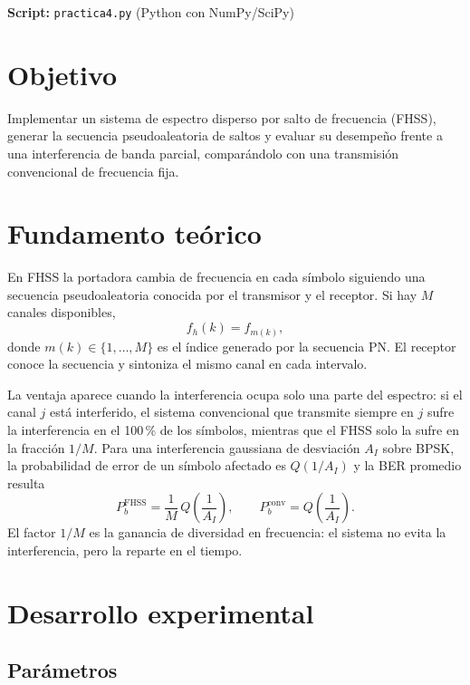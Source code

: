 \documentclass[11pt,a4paper]{article}
\begin{document}

\textbf{Script:} \texttt{practica4.py} (Python con NumPy/SciPy)

\section{Objetivo}

Implementar un sistema de espectro disperso por salto de frecuencia (FHSS), generar la
secuencia pseudoaleatoria de saltos y evaluar su desempeño frente a una interferencia de
banda parcial, comparándolo con una transmisión convencional de frecuencia fija.

\section{Fundamento teórico}

En FHSS la portadora cambia de frecuencia en cada símbolo siguiendo una secuencia
pseudoaleatoria conocida por el transmisor y el receptor. Si hay $M$ canales disponibles,
\begin{equation}
  f_h(k) = f_{m(k)},
\end{equation}
donde $m(k)\in\{1,\dots,M\}$ es el índice generado por la secuencia PN. El receptor conoce
la secuencia y sintoniza el mismo canal en cada intervalo.

La ventaja aparece cuando la interferencia ocupa solo una parte del espectro: si el canal
$j$ está interferido, el sistema convencional que transmite siempre en $j$ sufre la
interferencia en el 100\,\% de los símbolos, mientras que el FHSS solo la sufre en la
fracción $1/M$. Para una interferencia gaussiana de desviación $A_I$ sobre BPSK, la
probabilidad de error de un símbolo afectado es $Q(1/A_I)$ y la BER promedio resulta
\begin{equation}
  P_b^{\mathrm{FHSS}} = \frac{1}{M}\,Q\!\left(\frac{1}{A_I}\right),
  \qquad
  P_b^{\mathrm{conv}} = Q\!\left(\frac{1}{A_I}\right).
\end{equation}
El factor $1/M$ es la ganancia de diversidad en frecuencia: el sistema no evita la
interferencia, pero la reparte en el tiempo.

\section{Desarrollo experimental}

\subsection{Parámetros}
\end{document}
